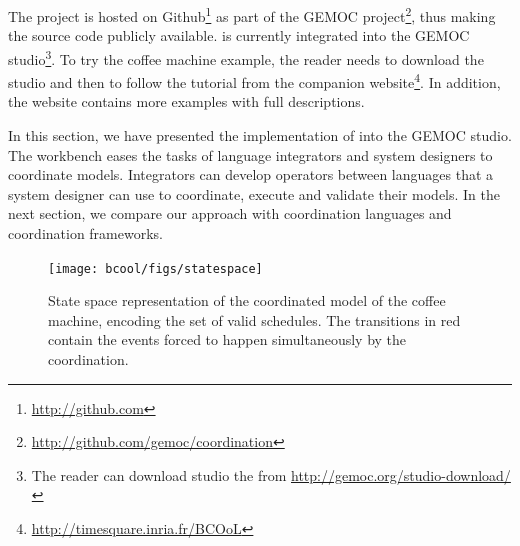 The project \bcool is hosted on Github\footnote{\url{http://github.com}} as part of the GEMOC project\footnote{\url{http://github.com/gemoc/coordination}}, thus making the source code publicly available. \bcool is currently integrated into the GEMOC studio\footnote{The reader can download studio the from \url{http://gemoc.org/studio-download/}}. To try the coffee machine example, the reader needs to download the studio and then to follow the tutorial from the companion website\footnote{\url{http://timesquare.inria.fr/BCOoL}}. In addition, the website contains more examples with full descriptions. %

In this section, we have presented the implementation of \bcool into the GEMOC studio. The workbench eases the tasks of language integrators and system designers to coordinate models. Integrators can develop operators between languages that a system designer can use to coordinate, execute and validate their models. In the next section, we compare our approach with coordination languages and coordination frameworks.  

\begin{figure}[]
	\begin{center}
		\texttt{[image: bcool/figs/statespace]}
		\caption{State space representation of the coordinated model of the coffee machine, encoding the set of valid schedules. The transitions in red contain the events forced to happen simultaneously by the coordination.}
		\label{fig:statespace}
	\end{center}
\end{figure}

	

